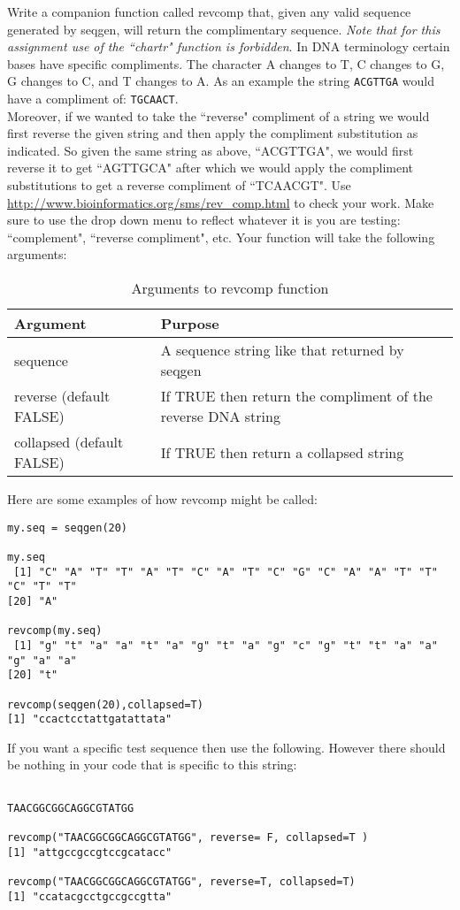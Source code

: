 \documentclass{article}
\begin{document}
Write a companion function called revcomp that, given any valid sequence generated by seqgen, will return the complimentary sequence. \emph{Note that for this assignment use of the ``chartr" function is forbidden}. In DNA terminology certain bases have specific compliments. The character A changes to T, C changes to G, G changes to C, and T changes to A. As an example the string \texttt{ACGTTGA} would have a compliment of: \texttt{TGCAACT}. 
\\

Moreover, if we wanted to take the ``reverse" compliment of a string we would first reverse the given string and then apply the compliment substitution as indicated. So given the same string as above, ``ACGTTGA", we would first reverse it to get ``AGTTGCA" after which we would apply the compliment substitutions to get a reverse compliment of ``TCAACGT". Use \url{http://www.bioinformatics.org/sms/rev_comp.html} to check your work. Make sure to use the drop down menu to reflect whatever it is you are testing: ``complement", ``reverse compliment", etc. Your function will take the following arguments:

\begin{table}[ht]
\caption{Arguments to revcomp function}
\begin{tabular}{l | l}
\hline\hline
Argument & Purpose \\ [1ex]
\hline
sequence & A sequence string like that returned by seqgen \\ [1ex]
\hline 
reverse (default FALSE) & If TRUE then return the compliment of the reverse DNA string \\ 
\hline
collapsed (default FALSE) & If TRUE then return a collapsed string \\
\hline
\end{tabular}
\label{table:nonlin}
\end{table}

\noindent
Here are some examples of how revcomp might be called:
\begin{verbatim}
my.seq = seqgen(20)

my.seq
 [1] "C" "A" "T" "T" "A" "T" "C" "A" "T" "C" "G" "C" "A" "A" "T" "T" "C" "T" "T"
[20] "A"

revcomp(my.seq)
 [1] "g" "t" "a" "a" "t" "a" "g" "t" "a" "g" "c" "g" "t" "t" "a" "a" "g" "a" "a"
[20] "t"

revcomp(seqgen(20),collapsed=T)
[1] "ccactcctattgatattata"
\end{verbatim}
\noindent
If you want a specific test sequence then use the following. However there should be nothing in your code that is specific to this string:
\begin{verbatim}

TAACGGCGGCAGGCGTATGG

revcomp("TAACGGCGGCAGGCGTATGG", reverse= F, collapsed=T )
[1] "attgccgccgtccgcatacc"

revcomp("TAACGGCGGCAGGCGTATGG", reverse=T, collapsed=T)
[1] "ccatacgcctgccgccgtta"

\end{verbatim}
\end{document}
